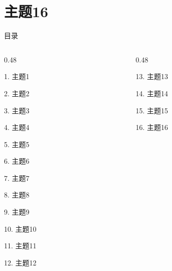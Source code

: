 \documentclass[aspectratio=169,10pt,fontset=fandol]{ctexbeamer}
\begin{document}
\section{主题16}
\begin{frame}[t,fragile]{目录}
\small
\begin{columns}[T,onlytextwidth]
\begin{column}{0.48\textwidth}
{\color{black}\small 1. 主题1\par}\vspace{0.22em}
{\color{black}\small 2. 主题2\par}\vspace{0.22em}
{\color{black}\small 3. 主题3\par}\vspace{0.22em}
{\color{black}\small 4. 主题4\par}\vspace{0.22em}
{\color{black}\small 5. 主题5\par}\vspace{0.22em}
{\color{black}\small 6. 主题6\par}\vspace{0.22em}
{\color{black}\small 7. 主题7\par}\vspace{0.22em}
{\color{black}\small 8. 主题8\par}\vspace{0.22em}
{\color{black}\small 9. 主题9\par}\vspace{0.22em}
{\color{black}\small 10. 主题10\par}\vspace{0.22em}
{\color{black}\small 11. 主题11\par}\vspace{0.22em}
{\color{black}\small 12. 主题12\par}\vspace{0.22em}
\end{column}
\begin{column}{0.48\textwidth}
{\color{black}\small 13. 主题13\par}\vspace{0.22em}
{\color{black}\small 14. 主题14\par}\vspace{0.22em}
{\color{black}\small 15. 主题15\par}\vspace{0.22em}
{\color{blue}\small 16. 主题16\par}\vspace{0.22em}

\end{column}
\end{columns}
\end{frame}
\end{document}
